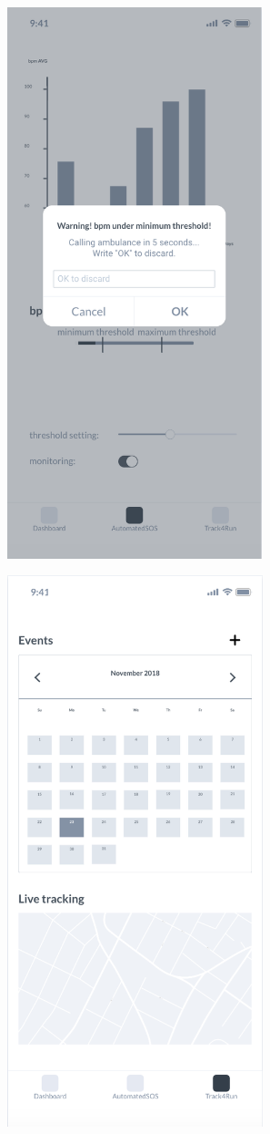 \documentclass{article}
\begin{document}
	\begin{figure}[!h]
	 	\centering
		\includegraphics[height=16cm,keepaspectratio]{Figures/6Low}
	\end{figure}\newpage	
	
	\begin{figure}[!h]
	 	\centering
		\includegraphics[height=16cm,keepaspectratio]{Figures/7Track4Run}
	\end{figure}\newpage	
	
\end{document}
